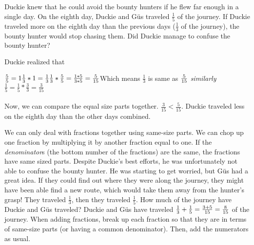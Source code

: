 {}
{Duckie knew that he could avoid the bounty hunters if he flew far enough in a single day. On the eighth day, Duckie and G{\"u}s traveled $\frac{1}{5}$ of the journey. If Duckie traveled more on the eighth day than the previous days ($\frac{1}{3}$ of the journey), the bounty hunter would stop chasing them. Did Duckie manage to confuse the bounty hunter?}
{Duckie realized that \begin{center}
    $\frac{5}{5}=1 \linebreak
    \frac{1}{3}\ast 1 = \frac{1}{3} \linebreak
    \frac{1}{3}\ast\frac{5}{5} = \frac{1\ast 5}{3\ast 5} = \frac{5}{15}\linebreak  $Which means $\frac{1}{3}$  is same as  $\frac{5}{15} \linebreak\linebreak$
    \textit{similarly}
   $ \frac{1}{5} = \frac{1}{5}\ast\frac{3}{3} = \frac{3}{15}$
\end{center}
\paragraph{} Now, we can compare the equal size parts together. $\frac{3}{15} < \frac{5}{15}$. Duckie traveled less on the eighth day than the other days combined.}
{We can only deal with fractions together using same-size parts. We can chop up one fraction by multiplying it by another fraction equal to one. If the \textit{denominator}s (the bottom number of the fractions) are the same, the fractions have same sized parts.}
{}
{Despite Duckie's best efforts, he was unfortunately not able to confuse the bounty hunter. He was starting to get worried, but G{\"u}s had a great idea. If they could find out where they were along the journey, they might have been able find a new route, which would take them away from the hunter's grasp! They traveled $\frac{1}{3}$, then they traveled $\frac{1}{5}$. How much of the journey have Duckie and G{\"u}s traveled?}
{Duckie and G{\"u}s have traveled $\frac{1}{3}+\frac{1}{5}\linebreak=\frac{3+5}{15}\linebreak=\frac{8}{15}$ of the journey.}
{When adding fractions, break up each fraction so that they are in terms of same-size parts (or having a common denominator). Then, add the numerators as usual.}
{}
